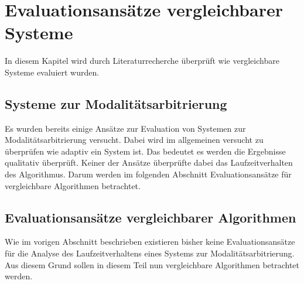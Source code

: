 \chapter{Evaluationsansätze vergleichbarer Systeme}

In diesem Kapitel wird durch Literaturrecherche überprüft wie vergleichbare Systeme evaluiert wurden.

\section{Systeme zur Modalitätsarbitrierung}

Es wurden bereits einige Ansätze zur Evaluation von Systemen zur Modalitätsarbitrierung versucht. Dabei wird im allgemeinen versucht  zu überprüfen wie adaptiv ein System ist. Das bedeutet es werden die Ergebnisse qualitativ überprüft. Keiner der Ansätze überprüfte dabei das Laufzeitverhalten des Algorithmus. Darum werden im folgenden Abschnitt Evaluationsansätze für vergleichbare Algorithmen betrachtet.

\section{Evaluationsansätze vergleichbarer Algorithmen}

Wie im vorigen Abschnitt beschrieben existieren bisher keine Evaluationsansätze für die Analyse des Laufzeitverhaltens eines Systems zur Modalitätsarbitrierung. Aus diesem Grund sollen in diesem Teil nun vergleichbare Algorithmen betrachtet werden.